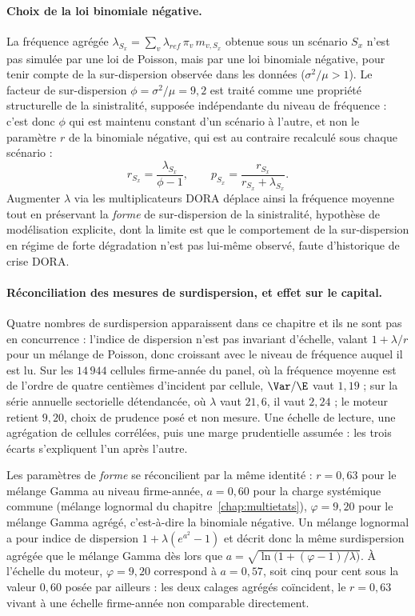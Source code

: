 \paragraph{Choix de la loi binomiale négative.} La fréquence agrégée
$\lambda_{S_x} = \sum_v \lambda_{ref}\,\pi_v\, m_{v,S_x}$ obtenue sous un
scénario $S_x$ n'est pas simulée par une loi de Poisson, mais par une loi
binomiale négative, pour tenir compte de la sur-dispersion observée dans les
données ($\sigma^2/\mu > 1$). Le facteur de sur-dispersion
$\phi = \sigma^2/\mu = 9{,}2$ est traité comme une propriété structurelle de
la sinistralité, supposée indépendante du niveau de fréquence : c'est donc
$\phi$ qui est maintenu constant d'un scénario à l'autre, et non le
paramètre $r$ de la binomiale négative, qui est au contraire recalculé sous
chaque scénario :
\begin{equation}
r_{S_x} = \frac{\lambda_{S_x}}{\phi - 1},
\qquad
p_{S_x} = \frac{r_{S_x}}{r_{S_x} + \lambda_{S_x}}.
\end{equation}
Augmenter $\lambda$ via les multiplicateurs DORA déplace ainsi la fréquence
moyenne tout en préservant la \emph{forme} de sur-dispersion de la
sinistralité, hypothèse de modélisation explicite, dont la limite est
que le comportement de la sur-dispersion en régime de forte dégradation
n'est pas lui-même observé, faute d'historique de crise DORA.

\paragraph{Réconciliation des mesures de surdispersion, et effet sur le capital.} Quatre nombres
de surdispersion apparaissent dans ce chapitre et ils ne sont pas en concurrence : l'indice de
dispersion n'est pas invariant d'échelle, valant $1+\lambda/r$ pour un mélange de Poisson, donc
croissant avec le niveau de fréquence auquel il est lu. Sur les $14\,944$ cellules firme-année du
panel, où la fréquence moyenne est de l'ordre de quatre centièmes d'incident par cellule,
$\Var/\E$ vaut $1{,}19$ ; sur la série annuelle sectorielle détendancée, où $\lambda$ vaut
$21{,}6$, il vaut $2{,}24$ ; le moteur retient $9{,}20$, choix de prudence posé et non mesure.
Une échelle de lecture, une agrégation de cellules corrélées, puis une marge prudentielle
assumée : les trois écarts s'expliquent l'un après l'autre.

Les paramètres de \emph{forme} se réconcilient par la même identité : $r=0{,}63$ pour le mélange
Gamma au niveau firme-année, $a=0{,}60$ pour la charge systémique commune (mélange lognormal du
chapitre~\ref{chap:multietats}), $\varphi=9{,}20$ pour le mélange Gamma agrégé, c'est-à-dire la
binomiale négative. Un mélange lognormal a pour indice de dispersion $1+\lambda(e^{a^2}-1)$ et
décrit donc la même surdispersion agrégée que le mélange Gamma dès lors que
$a=\sqrt{\ln\!\bigl(1+(\varphi-1)/\lambda\bigr)}$. À l'échelle du moteur, $\varphi=9{,}20$
correspond à $a=0{,}57$, soit cinq pour cent sous la valeur $0{,}60$ posée par ailleurs : les deux
calages agrégés coïncident, le $r=0{,}63$ vivant à une échelle firme-année non comparable
directement.

